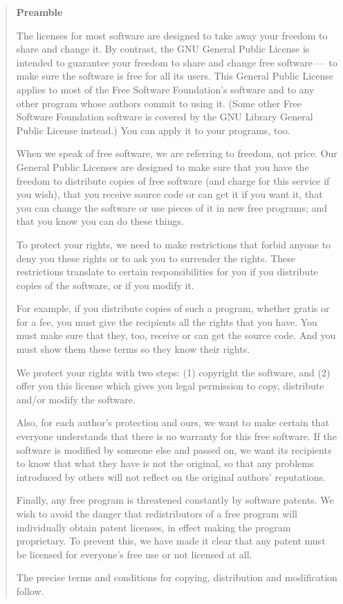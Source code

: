 \begin{quote}
  \begin{center} \textbf{Preamble} \end{center}

  The licenses for most software are designed to take away
  your freedom to share and change it.  By contrast, the GNU
  General Public License is intended to guarantee your
  freedom to share and change free software --- to make sure
  the software is free for all its users.  This General
  Public License applies to most of the Free Software
  Foundation's software and to any other program whose
  authors commit to using it.  (Some other Free Software
  Foundation software is covered by the GNU Library General
  Public License instead.)  You can apply it to your
  programs, too.

  When we speak of free software, we are referring to
  freedom, not price.  Our General Public Licenses are
  designed to make sure that you have the freedom to
  distribute copies of free software (and charge for this
  service if you wish), that you receive source code or can
  get it if you want it, that you can change the software or
  use pieces of it in new free programs; and that you know
  you can do these things.

  To protect your rights, we need to make restrictions that
  forbid anyone to deny you these rights or to ask you to
  surrender the rights.  These restrictions translate to
  certain responsibilities for you if you distribute copies
  of the software, or if you modify it.

  For example, if you distribute copies of such a program,
  whether gratis or for a fee, you must give the recipients
  all the rights that you have.  You must make sure that
  they, too, receive or can get the source code.  And you
  must show them these terms so they know their rights.

  We protect your rights with two steps: (1) copyright the
  software, and (2) offer you this license which gives you
  legal permission to copy, distribute and/or modify the
  software.

  Also, for each author's protection and ours, we want to
  make certain that everyone understands that there is no
  warranty for this free software.  If the software is
  modified by someone else and passed on, we want its
  recipients to know that what they have is not the
  original, so that any problems introduced by others will
  not reflect on the original authors' reputations.

  Finally, any free program is threatened constantly by
  software patents.  We wish to avoid the danger that
  redistributors of a free program will individually obtain
  patent licenses, in effect making the program proprietary.
  To prevent this, we have made it clear that any patent
  must be licensed for everyone's free use or not licensed
  at all.

  The precise terms and conditions for copying, distribution
  and modification follow.
\end{quote}

